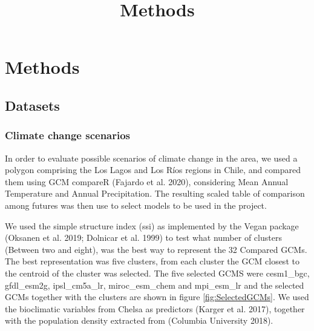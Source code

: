 \documentclass[
]{article}
\title{Methods}
\author{}
\date{\vspace{-2.5em}}
\begin{document}
\maketitle

\hypertarget{methods}{%
\section{Methods}\label{methods}}

\hypertarget{datasets}{%
\subsection{Datasets}\label{datasets}}

\hypertarget{climate-change-scenarios}{%
\subsubsection{Climate change scenarios}\label{climate-change-scenarios}}

In order to evaluate possible scenarios of climate change in the area, we used a polygon comprising the Los Lagos and Los Ríos regions in Chile, and compared them using GCM compareR (Fajardo et al. 2020), considering Mean Annual Temperature and Annual Precipitation. The resulting scaled table of comparison among futures was then use to select models to be used in the project.

We used the simple structure index (ssi) as implemented by the Vegan package (Oksanen et al. 2019; Dolnicar et al. 1999) to test what number of clusters (Between two and eight), was the best way to represent the 32 Compared GCMs. The best representation was five clusters, from each cluster the GCM closest to the centroid of the cluster was selected. The five selected GCMS were cesm1\_bgc, gfdl\_esm2g, ipsl\_cm5a\_lr, miroc\_esm\_chem and mpi\_esm\_lr and the selected GCMs together with the clusters are shown in figure \ref{fig:SelectedGCMs}. We used the bioclimatic variables from Chelsa as predictors (Karger et al. 2017), together with the population density extracted from (Columbia University 2018).
\end{document}
